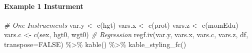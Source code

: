\documentclass[
]{book}
\newenvironment{Shaded}{\begin{snugshade}}{\end{snugshade}}
\newcommand{\AttributeTok}[1]{\textcolor[rgb]{0.77,0.63,0.00}{#1}}
\newcommand{\CommentTok}[1]{\textcolor[rgb]{0.56,0.35,0.01}{\textit{#1}}}
\newcommand{\ConstantTok}[1]{\textcolor[rgb]{0.00,0.00,0.00}{#1}}
\newcommand{\FunctionTok}[1]{\textcolor[rgb]{0.00,0.00,0.00}{#1}}
\newcommand{\NormalTok}[1]{#1}
\newcommand{\OtherTok}[1]{\textcolor[rgb]{0.56,0.35,0.01}{#1}}
\newcommand{\SpecialCharTok}[1]{\textcolor[rgb]{0.00,0.00,0.00}{#1}}
\newcommand{\StringTok}[1]{\textcolor[rgb]{0.31,0.60,0.02}{#1}}
\begin{document}
\hypertarget{example-1-insturment}{%
\paragraph{Example 1 Insturment}\label{example-1-insturment}}

\begin{Shaded}
\begin{Highlighting}[]
\CommentTok{\# One Instrucments}
\NormalTok{var.y }\OtherTok{\textless{}{-}} \FunctionTok{c}\NormalTok{(}\StringTok{\textquotesingle{}hgt\textquotesingle{}}\NormalTok{)}
\NormalTok{vars.x }\OtherTok{\textless{}{-}} \FunctionTok{c}\NormalTok{(}\StringTok{\textquotesingle{}prot\textquotesingle{}}\NormalTok{)}
\NormalTok{vars.z }\OtherTok{\textless{}{-}} \FunctionTok{c}\NormalTok{(}\StringTok{\textquotesingle{}momEdu\textquotesingle{}}\NormalTok{)}
\NormalTok{vars.c }\OtherTok{\textless{}{-}} \FunctionTok{c}\NormalTok{(}\StringTok{\textquotesingle{}sex\textquotesingle{}}\NormalTok{, }\StringTok{\textquotesingle{}hgt0\textquotesingle{}}\NormalTok{, }\StringTok{\textquotesingle{}wgt0\textquotesingle{}}\NormalTok{)}
\CommentTok{\# Regression}
\FunctionTok{regf.iv}\NormalTok{(var.y, vars.x, vars.c, vars.z, df, }\AttributeTok{transpose=}\ConstantTok{FALSE}\NormalTok{) }\SpecialCharTok{\%\textgreater{}\%}
  \FunctionTok{kable}\NormalTok{() }\SpecialCharTok{\%\textgreater{}\%}
  \FunctionTok{kable\_styling\_fc}\NormalTok{()}
\end{Highlighting}
\end{Shaded}
\end{document}
